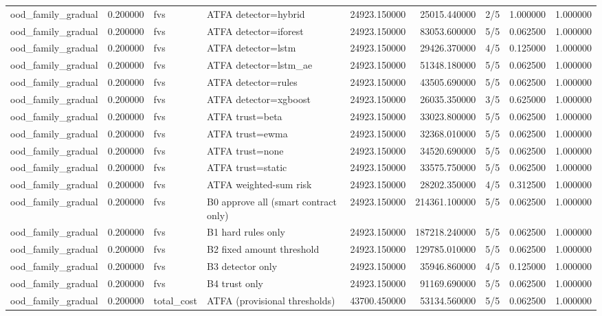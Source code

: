 \begin{tabular}{lrllrrlrr}
ood\_family\_gradual & 0.200000 & fvs & ATFA detector=hybrid & 24923.150000 & 25015.440000 & 2/5 & 1.000000 & 1.000000 \\
ood\_family\_gradual & 0.200000 & fvs & ATFA detector=iforest & 24923.150000 & 83053.600000 & 5/5 & 0.062500 & 1.000000 \\
ood\_family\_gradual & 0.200000 & fvs & ATFA detector=lstm & 24923.150000 & 29426.370000 & 4/5 & 0.125000 & 1.000000 \\
ood\_family\_gradual & 0.200000 & fvs & ATFA detector=lstm\_ae & 24923.150000 & 51348.180000 & 5/5 & 0.062500 & 1.000000 \\
ood\_family\_gradual & 0.200000 & fvs & ATFA detector=rules & 24923.150000 & 43505.690000 & 5/5 & 0.062500 & 1.000000 \\
ood\_family\_gradual & 0.200000 & fvs & ATFA detector=xgboost & 24923.150000 & 26035.350000 & 3/5 & 0.625000 & 1.000000 \\
ood\_family\_gradual & 0.200000 & fvs & ATFA trust=beta & 24923.150000 & 33023.800000 & 5/5 & 0.062500 & 1.000000 \\
ood\_family\_gradual & 0.200000 & fvs & ATFA trust=ewma & 24923.150000 & 32368.010000 & 5/5 & 0.062500 & 1.000000 \\
ood\_family\_gradual & 0.200000 & fvs & ATFA trust=none & 24923.150000 & 34520.690000 & 5/5 & 0.062500 & 1.000000 \\
ood\_family\_gradual & 0.200000 & fvs & ATFA trust=static & 24923.150000 & 33575.750000 & 5/5 & 0.062500 & 1.000000 \\
ood\_family\_gradual & 0.200000 & fvs & ATFA weighted-sum risk & 24923.150000 & 28202.350000 & 4/5 & 0.312500 & 1.000000 \\
ood\_family\_gradual & 0.200000 & fvs & B0 approve all (smart contract only) & 24923.150000 & 214361.100000 & 5/5 & 0.062500 & 1.000000 \\
ood\_family\_gradual & 0.200000 & fvs & B1 hard rules only & 24923.150000 & 187218.240000 & 5/5 & 0.062500 & 1.000000 \\
ood\_family\_gradual & 0.200000 & fvs & B2 fixed amount threshold & 24923.150000 & 129785.010000 & 5/5 & 0.062500 & 1.000000 \\
ood\_family\_gradual & 0.200000 & fvs & B3 detector only & 24923.150000 & 35946.860000 & 4/5 & 0.125000 & 1.000000 \\
ood\_family\_gradual & 0.200000 & fvs & B4 trust only & 24923.150000 & 91169.690000 & 5/5 & 0.062500 & 1.000000 \\
ood\_family\_gradual & 0.200000 & total\_cost & ATFA (provisional thresholds) & 43700.450000 & 53134.560000 & 5/5 & 0.062500 & 1.000000 \\

\end{tabular}
